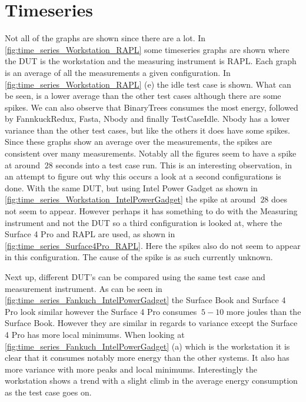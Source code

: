 \section{Timeseries}\label{sec:timeseries}


Not all of the graphs are shown since there are a lot. In \cref{fig:time_series_Workstation_RAPL} some timeseries graphs are shown where the DUT is the workstation and the measuring instrument is RAPL. Each graph is an average of all the measurements a given configuration. In \cref{fig:time_series_Workstation_RAPL} (e) the idle test case is shown. What can be seen, is a lower average than the other test cases although there are some spikes. We can also observe that BinaryTrees consumes the most energy, followed by FannkuckRedux, Fasta, Nbody and finally TestCaseIdle. Nbody has a lower variance than the other test cases, but like the others it does have some spikes. Since these graphs show an average over the measurements, the spikes are consistent over many measurements. Notably all the figures seem to have a spike at around $~28$ seconds into a test case run. This is an interesting observation, in an attempt to figure out why this occurs a look at a second configurations is done. With the same DUT, but using Intel Power Gadget as shown in \cref{fig:time_series_Workstation_IntelPowerGadget} the spike at around $~28$ does not seem to appear. However perhaps it has something to do with the Measuring instrument and not the DUT so a third configuration is looked at, where the Surface 4 Pro and RAPL are used, as shown in \cref{fig:time_series_Surface4Pro_RAPL}. Here the spikes also do not seem to appear in this configuration. The cause of the spike is as such currently unknown.


%
%


%

Next up, different DUT's can be compared using the same test case and measurement instrument. As can be seen in \cref{fig:time_series_Fankuch_IntelPowerGadget} the Surface Book and Surface 4 Pro look similar however the Surface 4 Pro consumes $~5-10$ more joules than the Surface Book. However they are similar in regards to variance except the Surface 4 Pro has more local minimums. When looking at \cref{fig:time_series_Fankuch_IntelPowerGadget} (a) which is the workstation it is clear that it consumes notably more energy than the other systems. It also has more variance with more peaks and local minimums. Interestingly the workstation shows a trend with a slight climb in the average energy consumption as the test case goes on.

